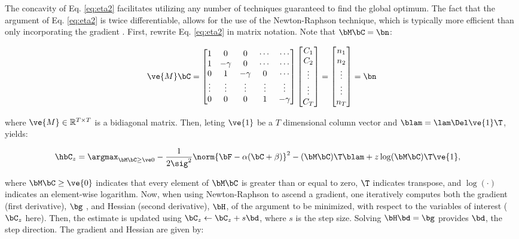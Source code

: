 \noindent The concavity of Eq. \eqref{eq:eta2} facilitates utilizing any number of techniques guaranteed to find the global optimum.  The fact that the argument of Eq. \eqref{eq:eta2} is twice differentiable, allows for the use of the Newton-Raphson technique, which is typically more efficient than only incorporating the gradient \cite{CONV04}. First, rewrite Eq. \eqref{eq:eta2} in matrix notation.  Note that $\bM \bC = \bn$:

\begin{align} \label{eq:M}
\ve{M} \bC = %
\begin{bmatrix}
1 & 0  & 0 & \cdots & \cdots \\
1 & -\gamma & 0 & \cdots & \cdots \\
0 & 1 & -\gamma & 0 & \cdots  \\
\vdots & \vdots & \vdots & \vdots & \vdots  \\
0 & 0 & 0 & 1 & -\gamma
\end{bmatrix}
\begin{bmatrix}
C_1 \\ C_2 \\ \vdots \\ \vdots \\ C_T  
\end{bmatrix}
= 
\begin{bmatrix}
n_1 \\ n_2 \\ \vdots \\ \vdots \\ n_T
\end{bmatrix}
= \bn
\end{align}

\noindent where $\ve{M} \in \mathbb{R}^{T \times T}$ is a bidiagonal matrix.  Then, leting $\ve{1}$ be a $T$ dimensional column vector and $\blam=\lam \Del \ve{1}\T$, yields: 

\begin{align} 
\hbC_{\zzz} 
&= \az  -\frac{1}{2 \sig^2} \norm{\bF - \alpha (\bC +\beta)}^2 - (\bM \bC )\T \blam  + \zzz \log(\bM \bC)\T\ve{1},  \label{eq:eta3}
\end{align}

\noindent where $\bM \bC \geq \ve{0}$ indicates that every element of $\bM \bC$ is greater than or equal to zero, $\T$ indicates transpose, and $\log(\cdot)$ indicates an element-wise logarithm. Now, when using Newton-Raphson to ascend a gradient, one iteratively computes both the gradient (first derivative), $\bg$ , and Hessian (second derivative), $\bH$, of the argument to be minimized, with respect to the variables of interest ($\bC_z$ here).  Then, the estimate is updated using $\bC_z \leftarrow \bC_z + s \bd$, where $s$ is the step size. Solving $\bH \bd = \bg$ provides $\bd$, the step direction.  The gradient and Hessian are given by:

